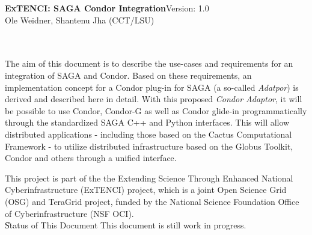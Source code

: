 \newif\ifdraft
\drafttrue                                                                                                   
\ifdraft
\newcommand{\llnote}[1]{ {\textcolor{green} { ***JK: #1 }}}
\newcommand{\alnote}[1]{ {\textcolor{blue} { ***AL: #1 }}}
\newcommand{\jhanote}[1]{ {\textcolor{red} { ***SJ: #1 }}}
\else
\newcommand{\llnote}[1]{}
\newcommand{\alnote}[1]{}
\newcommand{\jhanote}[1]{}
\fi


\newcommand{\sagadocument}{ExTENCI: SAGA Condor Integration}
\newcommand{\sagaversion}{1.0}%
\newcommand{\sagabasename}{saga-programming-guide}
\newcommand{\sagaemail}{\{oweidner|sjha\} @ cct.lsu.edu}



\newcommand{\name}{\F{SAGA}\xspace}
\DefineShortVerb{\|}



 \thispagestyle{empty}

  \textbf{\sagadocument}\hfill  Version: \sagaversion\\
  Ole Weidner, Shantenu Jha (CCT/LSU) \hfill {\sagadate} 

  \hrulefill\\[2em]

  \\[4em]

   The aim of this document is to describe the use-cases and
   requirements for an integration of SAGA and Condor. Based on these
   requirements, an implementation concept for a Condor plug-in for SAGA
   (a so-called \textit{Adatpor}) is  derived and described here in
   detail. With this proposed \textit{Condor Adaptor}, it will be
   possible to use Condor, Condor-G as well as Condor glide-in
   programmatically through the standardized SAGA C++ and Python
   interfaces. This will allow distributed applications - including
   those based on the Cactus Computational Framework - to utilize
   distributed infrastructure based on the Globus Toolkit, Condor and
   others through a unified interface.

   This project is part of the the Extending Science Through Enhanced
   National Cyberinfrastructure (ExTENCI) project, which is a joint Open
   Science Grid (OSG) and TeraGrid project, funded by the National
   Science Foundation Office of Cyberinfrastructure (NSF OCI). \\[2em]


   \U{Status of This Document}
   This document is still work in progress.\\
  
